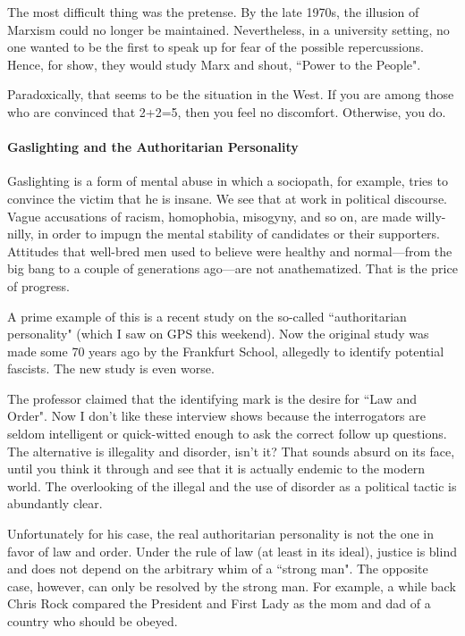 The most difficult thing was the pretense. By the late 1970s, the illusion of Marxism could no longer be maintained. Nevertheless, in a university setting, no one wanted to be the first to speak up for fear of the possible repercussions. Hence, for show, they would study Marx and shout, ``Power to the People".

Paradoxically, that seems to be the situation in the West. If you are among those who are convinced that 2+2=5, then you feel no discomfort. Otherwise, you do.

\paragraph{Gaslighting and the Authoritarian Personality}
Gaslighting is a form of mental abuse in which a sociopath, for example, tries to convince the victim that he is insane. We see that at work in political discourse. Vague accusations of racism, homophobia, misogyny, and so on, are made willy-nilly, in order to impugn the mental stability of candidates or their supporters. Attitudes that well-bred men used to believe were healthy and normal—from the big bang to a couple of generations ago—are not anathematized. That is the price of progress.

A prime example of this is a recent study on the so-called ``authoritarian personality" (which I saw on GPS this weekend). Now the original study was made some 70 years ago by the Frankfurt School, allegedly to identify potential fascists. The new study is even worse.

The professor claimed that the identifying mark is the desire for ``Law and Order". Now I don't like these interview shows because the interrogators are seldom intelligent or quick-witted enough to ask the correct follow up questions. The alternative is illegality and disorder, isn't it? That sounds absurd on its face, until you think it through and see that it is actually endemic to the modern world. The overlooking of the illegal and the use of disorder as a political tactic is abundantly clear.

Unfortunately for his case, the real authoritarian personality is not the one in favor of law and order. Under the rule of law (at least in its ideal), justice is blind and does not depend on the arbitrary whim of a ``strong man". The opposite case, however, can only be resolved by the strong man. For example, a while back Chris Rock compared the President and First Lady as the mom and dad of a country who should be obeyed.


